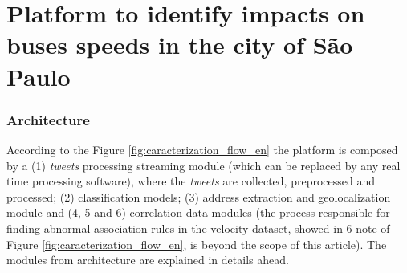 \documentclass[runningheads]{llncs}
\begin{document}

\section{Platform to identify impacts on buses speeds in the city of São Paulo}

\subsubsection{Architecture}

According to the Figure \ref{fig:caracterization_flow_en} the platform is composed by a (1) \textit{tweets} processing streaming module (which can be replaced by any real time processing software), where the \textit{tweets} are collected, preprocessed and processed; (2) classification models; (3) address extraction and geolocalization module and (4, 5 and 6) correlation data modules (the process responsible for finding abnormal association rules in the velocity dataset, showed in 6 note of Figure \ref{fig:caracterization_flow_en}, is beyond the scope of this article). The modules from architecture are explained in details ahead.
\end{document}
